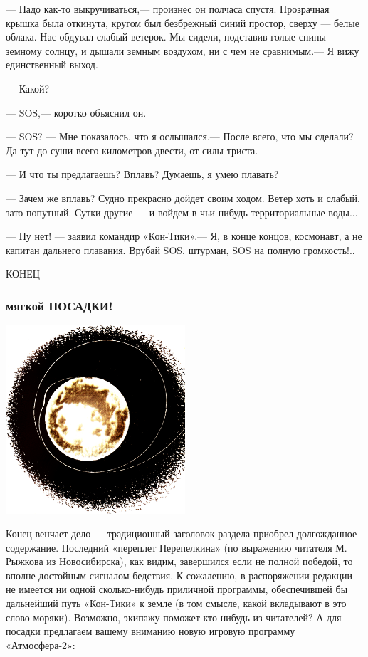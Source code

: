 \documentclass[11pt,a4paper,oneside]{article}
\begin{document}
— Надо как-то выкручиваться,— произнес он полчаса спустя. Прозрачная крышка была откинута, кругом был безбрежный синий простор, сверху — белые облака. Нас обдувал слабый ветерок. Мы сидели, подставив голые спины земному солнцу, и дышали земным воздухом, ни с чем не сравнимым.— Я вижу единственный выход.

— Какой?

— SOS,— коротко объяснил он.

— SOS? — Мне показалось, что я ослышался.— После всего, что мы сделали? Да тут до суши всего километров двести, от силы триста.

— И что ты предлагаешь? Вплавь? Думаешь, я умею плавать?

— Зачем же вплавь? Судно прекрасно дойдет своим ходом. Ветер хоть и слабый, зато попутный. Сутки-другие — и войдем в чьи-нибудь территориальные воды...

— Ну нет! — заявил командир «Кон-Тики».— Я, в конце концов, космонавт, а не капитан дальнего плавания. Врубай SOS, штурман, SOS на полную громкость!..

КОНЕЦ

\subsubsection{мягкой ПОСАДКИ!}
\includegraphics[width=0.5\textwidth]{sos3}

Конец венчает дело — традиционный заголовок раздела приобрел долгожданное содержание. Последний «переплет Перепелкина» (по выражению читателя М. Рыжкова из Новосибирска), как видим, завершился если не полной победой, то вполне достойным сигналом бедствия. К сожалению, в распоряжении редакции не имеется ни одной сколько-нибудь приличной программы, обеспечившей бы дальнейший путь «Кон-Тики» к земле (в том смысле, какой вкладывают в это слово моряки). Возможно, экипажу поможет кто-нибудь из читателей? А для посадки предлагаем вашему вниманию новую игровую программу «Атмосфера-2»:
\end{document}
